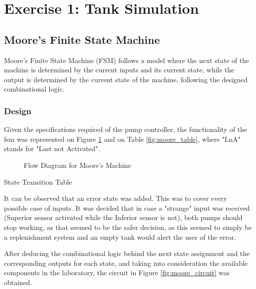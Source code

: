 \section{\color{olive}Exercise 1: Tank Simulation}

\subsection{\color{purple}Moore's Finite State Machine}

Moore's Finite State Machine (FSM) follows a model where the next state of the machine is determined by the current
inputs and its current state, while the output is determined by the current state of the machine, following the
designed combinational logic.

\subsubsection{\color{orange}Design}

Given the specifications required of the pump controller, the functionality of the fsm was represented
on Figure \ref{fig:moore_flow} and on Table \ref{fig:moore_table}, where "LnA" stands for "Last not Activated".

\begin{figure}[H]
    \begin{center}
        
        \caption{Flow Diagram for Moore's Machine}
        \label{fig:moore_flow}
    \end{center}
\end{figure}

\begin{table}[H]
    \begin{center}
        
        \caption{State Transition Table}
        \label{fig:moore_table}
    \end{center}
\end{table}

It can be observed that an error state was added. This was to cover every possible case of inputs. It was decided that
in case a "strange" input was received (Superior sensor activated while the Inferior sensor is not), both pumps should
stop working, as that seemed to be the safer decision, as this seemed to simply be a replenishment system and an empty
tank would alert the user of the error.

After deducing the combinational logic behind the next state assignment and the corresponding outputs for each state,
and taking into consideration the available components in the laboratory, the circuit in Figure \ref{fig:moore_circuit}
was obtained.

